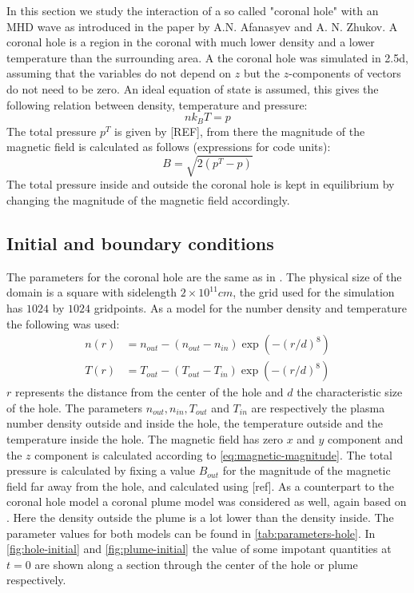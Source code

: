 In this section we study the interaction of a so called "coronal hole" with an MHD wave as introduced in the paper \cite{coronal-hole} by A.N. Afanasyev and A. N. Zhukov. 
A coronal hole is a region in the coronal with much lower density and a lower temperature than the surrounding area.
A the coronal hole was simulated in 2.5d, assuming that the variables do not depend on $z$ but the $z$-components of vectors do not need to be zero.
An ideal equation of state is assumed, this gives the following relation between density, temperature and pressure:
\begin{equation}
	nk_BT = p
	\label{eq:ideal-gas}
\end{equation}
The total pressure $p^T$ is given by [REF], from there the magnitude of the magnetic field is calculated as follows (expressions for code units):
\begin{equation}
	B = \sqrt{2 \left( p^T-p \right) }
	\label{eq:magnetic-magnitude}
\end{equation}
The total pressure inside and outside the coronal hole is kept in equilibrium by changing the magnitude of the magnetic field accordingly.

\subsection{Initial and boundary conditions}

The parameters for the coronal hole are the same as in \cite{coronal-hole}. 
The physical size of the domain is a square with sidelength $2\times 10^{11}cm$, the grid used for the simulation has $1024$ by $1024$ gridpoints. As a model for the number density and temperature the following was used:
\begin{equation}
	\label{eq:hole-model}
	\begin{split}
		n(r) &= n_{out} - (n_{out}-n_{in})\exp \left( -(r/d)^8 \right)\\
		T(r) &= T_{out} - (T_{out}-T_{in})\exp \left( -(r/d)^8 \right) 
	\end{split}
\end{equation}
$r$ represents the distance from the center of the hole and $d$ the characteristic size of the hole. 
The parameters $n_{out}, n_{in}, T_{out}$ and $T_{in}$ are respectively the plasma number density outside and inside the hole, the temperature outside and the temperature inside the hole. 
The magnetic field has zero $x$ and $y$ component and the $z$ component is calculated according to \cref{eq:magnetic-magnitude}.
The total pressure is calculated by fixing a value $B_{out}$ for the magnitude of the magnetic field far away from the hole, and calculated using [ref].
As a counterpart to the coronal hole model a coronal plume model was considered as well, again based on \cite{coronal-hole}.
Here the density outside the plume is a lot lower than the density inside.
The parameter values for both models can be found in \cref{tab:parameters-hole}.
In \cref{fig:hole-initial} and \cref{fig:plume-initial} the value of some impotant quantities at $t=0$ are shown along a section through the center of the hole or plume respectively.


